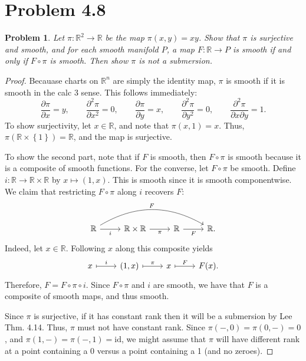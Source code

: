 \documentclass[11pt, letterpaper]{article}
\theoremstyle{plain}
\newtheorem{problem}{Problem}[section]
\begin{document}
\section{Problem 4.8}
\begin{problem}
	Let $\pi : \mathbb{R} ^2 \to \mathbb{R} $ be the map $\pi (x,y)=xy$. Show that $\pi $ is surjective and smooth, and for each smooth manifold $P$, a map $F : \mathbb{R}  \to P$ is smooth if and only if $F\circ \pi $ is smooth. Then show $\pi $ is not a submersion.
\end{problem}
\begin{proof}
	Becauase charts on $\mathbb{R} ^n$ are simply the identity map, $\pi $ is smooth if it is smooth in the calc 3 sense. This follows immediately:
	\[
		\frac{\partial \pi }{\partial x} =y,\qquad \frac{\partial ^2\pi }{\partial x^2} =0,\qquad \frac{\partial \pi }{\partial y} =x,\qquad \frac{\partial^2 \pi }{\partial y^2} =0,\qquad \frac{\partial ^2\pi }{\partial x \partial y} =1
	.\]
	To show surjectivity, let $x\in\mathbb{R} $, and note that $\pi (x,1)=x$. Thus, $\pi (\mathbb{R} \times \left\{ 1 \right\} )=\mathbb{R} $, and the map is surjective.


	To show the second part, note that if $F$ is smooth, then $F\circ \pi $ is smooth because it is a composite of smooth functions. For the converse, let $F\circ \pi $ be smooth. Define $i : \mathbb{R}  \to  \mathbb{R} \times \mathbb{R} $ by $x\mapsto (1,x)$. This is smooth since it is smooth componentwise. We claim that restricting $F\circ \pi $ along $i$ recovers $F$:
	\[\begin{tikzcd}[row sep = 2.5em, column sep = 2.5em]
	\mathbb{R} \ar[" i "', r] \ar[" F ", bend left, rrr] & \mathbb{R} \times \mathbb{R} \ar[" \pi  "', r]  & \mathbb{R} \ar[" F "', r]  & \mathbb{R} .
	\end{tikzcd}\]
	Indeed, let $x\in\mathbb{R} $. Following $x$ along this composite yields
	\[\begin{tikzcd}[row sep = 2.5em, column sep = 2.5em]
	x \ar[" i ", mapsto, r]  & (1,x)\ar[" \pi  ", mapsto, r]  & x\ar[" F ", mapsto, r]  & F(x).
	\end{tikzcd}\]
	Therefore, $F=F\circ \pi \circ i$. Since $F\circ \pi $ and $i$ are smooth, we have that $F$ is a composite of smooth maps, and thus smooth.

	Since $\pi $ is surjective, if it has constant rank then it will be a submersion by Lee Thm. 4.14. Thus, $\pi $ must not have constant rank. Since $\pi (-,0)=\pi (0,-)=0$, and $\pi (1,-)=\pi (-,1)=\mathrm{id} $, we might assume that $\pi $ will have different rank at a point containing a 0 versus a point containing a 1 (and no zeroes).


\end{proof}
\end{document}
